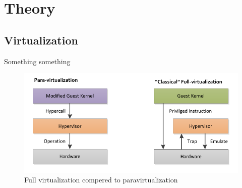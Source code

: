 \section{Theory}

\subsection{Virtualization} 
\label{theory:kernels}

Something something

\begin{figure}[htbp]
    \centering
    \includegraphics[width=\textwidth]{Images/Virtualization_-_Para_vs_Full.png}
    \caption{Full virtualization compered to paravirtualization}

    \label{fig:kernel_layout}
\end{figure}


